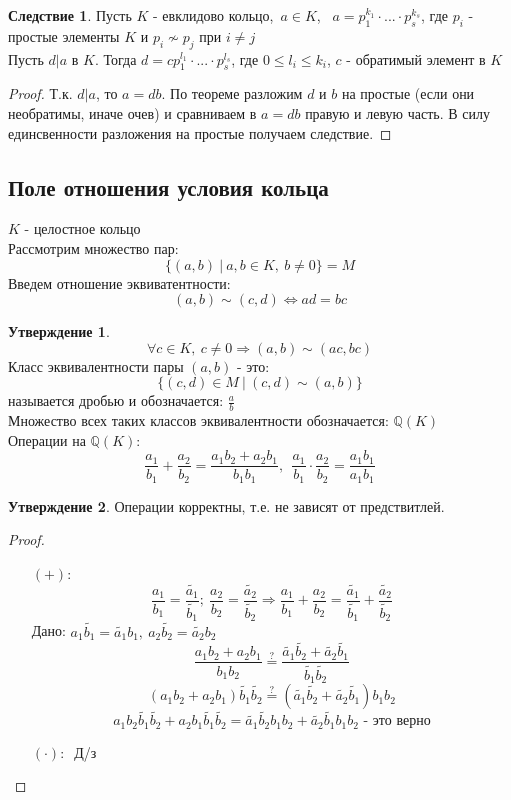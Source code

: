 \documentclass[a4paper, 12pt]{article}
\newcommand{\Q}{\mathbb Q}
\newcommand\tab[1][.5cm]{\hspace*{#1}}
\newcounter{concount}
\theoremstyle{definition}
\newtheorem{consequensenum}[concount]{Следствие}
\newtheorem*{subtheorem}{Утверждение}
\begin{document}
  \begin{consequensenum}
    Пусть $K$ - евклидово кольцо,\ $a\in K$, \ $a=p_1^{k_1}\cdot ...\cdot p_s^{k_s}$, где $p_i$ - простые элементы $K$ и $p_i \not \sim p_j$ при $i \neq j$\\
    Пусть $d|a$ в $K$. Тогда $d = c p_1^{l_1}\cdot ... \cdot p_s^{l_s}$, где $0\leq l_i\leq k_i$, $c$ - обратимый элемент в $K$             
  \end{consequensenum}
  \begin{proof}
    Т.к. $d|a$, то $a = db$. По теореме разложим $d$ и $b$ на простые (если они необратимы, иначе очев) и сравниваем в $a = db$ правую и левую часть. В силу единсвенности разложения на простые получаем следствие.     
  \end{proof}
  \subsection{Поле отношения условия кольца}
  $K$ - целостное кольцо\\
  Рассмотрим множество пар: 
  $$\{(a, b) \ | \ a, b \in K, \ b\neq 0\}= M$$
  Введем отношение эквиватентности:
  $$(a, b)\sim (c, d) \Longleftrightarrow ad = bc$$
  \begin{subtheorem}
    $$\forall c \in K, \ c\neq 0 \Longrightarrow (a, b) \sim (ac, bc)$$
    Класс эквивалентности пары $(a, b)$ - это: 
    $$\{(c, d) \in M \ | \ (c, d) \sim (a, b)\}$$
    называется дробью и обозначается: $\frac{a}{b}$ \\
    Множество всех таких классов эквивалентности обозначается: $\Q (K)$ \\
    Операции на $\Q (K)$: 
    $$\frac{a_1}{b_1} + \frac{a_2}{b_2} = \frac{a_1b_2 + a_2b_1}{b_1b_1}, \ \ \frac{a_1}{b_1} \cdot \frac{a_2}{b_2} = \frac{a_1b_1}{a_1b_1}$$ 
  \end{subtheorem}
  \begin{subtheorem}
    Операции корректны, т.е. не зависят от предствитлей.
  \end{subtheorem}
  \begin{proof}\tab
    \begin{itemize} 
      \item[$(+): \ $] 
      $$\frac{a_1}{b_1} = \frac{\widetilde{a_1}}{\widetilde{b_1}}; \ \frac{a_2}{b_2} = \frac{\widetilde{a_2}}{\widetilde{b_2}} \Longrightarrow \frac{a_1}{b_1} + \frac{a_2}{b_2} = \frac{\widetilde{a_1}}{\widetilde{b_1}} + \frac{\widetilde{a_2}}{\widetilde{b_2}}$$
      Дано: $a_1 \widetilde{b_1} = \widetilde{a_1}b_1, \ a_2 \widetilde{b_2} = \widetilde{a_2}b_2$
      $$\frac{a_1b_2 + a_2b_1}{b_1b_2} \overset{?}{=}  \frac{\widetilde{a_1} \widetilde{b_2} + \widetilde{a_2} \widetilde{b_1}}{\widetilde{b_1} \widetilde{b_2}}$$
      $$(a_1b_2 + a_2b_1) \widetilde{b_1} \widetilde{b_2} \overset{?}{=} (\widetilde{a_1} \widetilde{b_2} + \widetilde{a_2} \widetilde{b_1})b_1b_2$$
      $$a_1b_2 \widetilde{b_1} \widetilde{b_2}+ a_2b_1 \widetilde{b_1} \widetilde{b_2} = \widetilde{a_1} \widetilde{b_2} b_1b_2 + \widetilde{a_2} \widetilde{b_1} b_1b_2 \text{ - это верно}$$
      \item[ $(\cdot): \ $ ] Д/з
    \end{itemize}
  \end{proof} 
\end{document}
